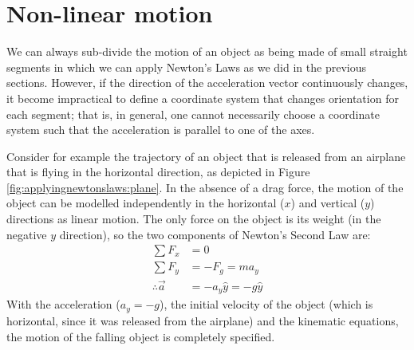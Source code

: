 \section{Non-linear motion}
We can always sub-divide the motion of an object as being made of small straight segments in which we can apply Newton's Laws as we did in the previous sections. However, if the direction of the acceleration vector continuously changes, it become impractical to define a coordinate system that changes orientation for each segment; that is, in general, one cannot necessarily choose a coordinate system such that the acceleration is parallel to one of the axes. 

Consider for example the trajectory of an object that is released from an airplane that is flying in the horizontal direction, as depicted in Figure \ref{fig:applyingnewtonslaws:plane}. 
In the absence of a drag force, the motion of the object can be modelled independently in the horizontal ($x$) and vertical ($y$) directions as linear motion.  The only force on the object is its weight (in the negative $y$ direction), so the two components of Newton's Second Law are:
\begin{align*}
\sum F_x &= 0\\
\sum F_y &= -F_g = ma_y\\
\therefore \vec a &= -a_y \hat y=-g\hat y
\end{align*}
With the acceleration ($a_y=-g$), the initial velocity of the object (which is horizontal, since it was released from the airplane) and the kinematic equations, the motion of the falling object is completely specified. 

